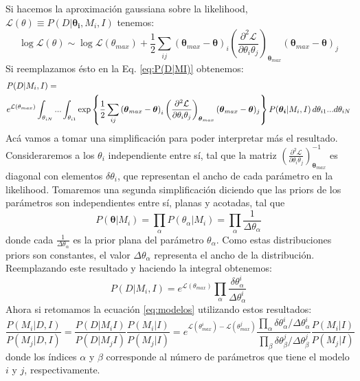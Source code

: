 \documentclass[aps,onecolumn,12pt,notitlepage]{revtex4-2}
\begin{document}
Si hacemos la aproximación gaussiana sobre la likelihood, $\mathcal{L}(\theta) \equiv P(D|\boldsymbol{\theta_{i}},M_{i} ,I)$ tenemos:
\begin{equation}
\log \mathcal{L}(\theta) \sim \log \mathcal{L}(\theta_{max}) + \frac{1}{2} \sum_{ij} \left(\boldsymbol{\theta}_{max} - \boldsymbol{\theta}\right)_{i} \left(\frac{\partial^2 \mathcal{L}}{\partial \theta_{i} \theta_{j}}\right)_{\boldsymbol{\theta}_{max}} (\boldsymbol{\theta}_{max} - \boldsymbol{\theta})_{j}
\end{equation}
Si reemplazamos ésto en la Eq. \ref{eq:P(D|MI)} obtenemos:
\begin{equation}
\begin{aligned}
\displaystyle &P(D|M_{i}, I) = \\ &e^{\mathcal{L}(\theta_{max})}\int_{\theta_{iN}} ... \int_{\theta_{i1}} \exp \left\{  \frac{1}{2} \sum_{ij} \left(\boldsymbol{\theta}_{max} - \boldsymbol{\theta}\right)_{i} \left(\frac{\partial^2 \mathcal{L}}{\partial \theta_{i} \theta_{j}}\right)_{\boldsymbol{\theta}_{max}} (\boldsymbol{\theta}_{max} - \boldsymbol{\theta})_{j} \right\} P(\boldsymbol{\theta_{i}}	|M_{i},I)\,  d\theta_{i1} ... d\theta_{iN} 
\end{aligned}
\end{equation}
Acá vamos a tomar una simplificación para poder interpretar más el resultado. Consideraremos a los $\theta_{i}$ independiente entre sí, tal que la matriz $\left(\frac{\partial^2 \mathcal{L}}{\partial \theta_{i} \theta_{j}}\right)^{-1}_{\boldsymbol{\theta}_{max}}$ es diagonal con elementos $\delta \theta_{i}$, que representan el ancho de cada parámetro en la likelihood. Tomaremos una segunda simplificación diciendo que las priors de los parámetros son independientes entre sí, planas y acotadas, tal que
\begin{equation}
P(\boldsymbol{\theta}|M_{i}) =  \prod_{\alpha} P(\theta_{\alpha}|M_{i}) = \prod_{\alpha} \frac{1}{\Delta \theta_{\alpha}}
\end{equation}
donde cada $\frac{1}{\Delta \theta_{\alpha}}$ es la prior plana del parámetro $\theta_{\alpha}$. Como estas distribuciones priors son constantes, el valor $\Delta \theta_{\alpha}$ representa el ancho de la distribución. Reemplazando este resultado y haciendo la integral obtenemos:
\begin{equation}
\displaystyle P(D|M_{i}, I) = e^{\mathcal{L}(\theta_{max})} \prod_{\alpha} \frac{\delta \theta^{i}_{\alpha}}{ \Delta \theta^{i}_{\alpha}}
\end{equation}
Ahora si retomamos la ecuación \ref{eq:modelos} utilizando estos resultados:
\begin{equation}
\frac{P(M_{i}|D,I)}{P(M_{j}|D,I)} = \frac{P(D|M_{i} I)}{P(D|M_{j} I)} \frac{P(M_{i}|I)}{P(M_{j}|I)} = e^{\mathcal{L}(\theta^{i}_{max}) - \mathcal{L}(\theta^{j}_{max})} \frac{\prod_{\alpha} \delta \theta^{i}_{\alpha}/\Delta \theta^{i}_{\alpha}}{\prod_{\beta} \delta \theta^{j}_{\beta} /\Delta \theta^{j}_{\beta}}\frac{P(M_{i}|I)}{P(M_{j}|I)}
\end{equation}
donde los índices $\alpha$ y $\beta$ corresponde al número de parámetros que tiene el modelo $i$ y $j$, respectivamente.
\end{document}

